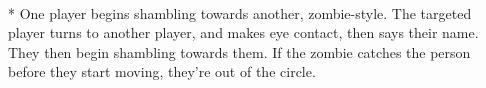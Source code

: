 \begin{minipage}{\textwidth}
\\*
One player begins shambling towards another, zombie-style.  The targeted player turns to another player, and makes eye contact, then says their name.  They then begin shambling towards them.  If the zombie catches the person before they start moving, they're out of the circle.
\end{minipage}    \vfill
